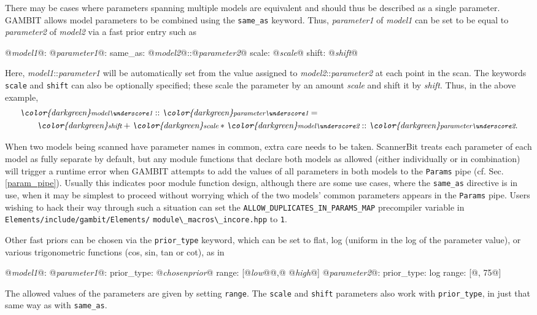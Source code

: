 \documentclass[pdftex,twocolumn,epjc3_preprint,runningheads]{svjour3}
\renewcommand{\_}{\discretionary{\underscore}{}{\underscore}}
\newcommand\cpp[1]{{\lstinline!#1!}}  %
\newcommand\yaml[1]{{\lstset{style=yaml}\lstinline!#1!\lstset{style=cpp}}}
\newcommand\yamlvalue[1]{{\YAMLvaluestyle\ttfamily#1}}
\newcommand\term[1]{{\lstset{style=terminal}\lstinline!#1!\lstset{style=cpp}}}
\newcommand\YAMLvaluestyle{\footnotesize\color{blue}\mdseries}
\newcommand{\metavarf}[1]{\textit{\color{darkgreen}\footnotesize\textrm{#1}}}
\newcommand{\metavar}{\metavarf}
\newcommand{\gambit}{\textsf{GAMBIT}\xspace}
\newcommand{\scannerbit}{\textsf{ScannerBit}\xspace}
\newcommand{\GB}{\gambit}
\begin{document}
There may be cases where parameters spanning multiple models are equivalent and should thus be described as a single parameter.  \GB allows model parameters to be combined using the \yaml{same_as} keyword.  Thus, \metavar{parameter\_1} of \metavar{model\_1} can be set to be equal to \metavar{parameter\_2} of \metavar{model\_2} via a fast prior entry such as
\begin{lstyaml}
  @\metavar{model\_1}@:
     @\metavar{parameter\_1}@:
        same_as: @\metavar{model\_2}@::@\metavar{parameter\_2}@
        scale: @\metavar{scale}@
        shift: @\metavar{shift}@
\end{lstyaml}
Here, \metavar{model\_1}::\metavar{parameter\_1} will be automatically set from the value assigned to \metavar{model\_2}::\metavar{parameter\_2} at each point in the scan.  The keywords \yaml{scale} and \yaml{shift} can also be optionally specified; these scale the parameter by an amount \metavar{scale} and shift it by \metavar{shift}.  Thus, in the above example,
\begin{eqnarray}
 \lefteqn{\metavar{model\_1}::\metavar{parameter\_1} =} \nonumber\\
 & & \quad \metavar{shift} + \metavar{scale} * \metavar{model\_2}::\metavar{parameter\_2}.
\end{eqnarray}

When two models being scanned have parameter names in common, extra care needs to be taken.  \scannerbit treats each parameter of each model as fully separate by default, but any module functions that declare both models as allowed (either individually or in combination) will trigger a runtime error when \GB attempts to add the values of all parameters in both models to the \cpp{Params} pipe (cf. Sec. \ref{param_pipe}).  Usually this indicates poor module function design, although there are some use cases, where the \yaml{same_as} directive is in use, when it may be simplest to proceed without worrying which of the two models' common parameters appears in the \cpp{Params} pipe.  Users wishing to hack their way through such a situation can set the \cpp{ALLOW_DUPLICATES_IN_PARAMS_MAP} precompiler variable in \term{Elements/include/gambit/}\term{Elements/} \term{module\_}\term{macros\_}\term{incore.hpp} to \cpp{1}.

Other fast priors can be chosen via the \yaml{prior_type} keyword, which can be set to \yamlvalue{flat}, \yamlvalue{log} (uniform in the log of the parameter value), or various trigonometric functions (\yamlvalue{cos}, \yamlvalue{sin}, \yamlvalue{tan} or \yamlvalue{cot}), as in
\begin{lstyaml}
  @\metavar{model\_1}@:
     @\metavar{parameter\_1}@:
        prior_type: @\metavar{chosen\_prior}@
        range: [@\metavar{low}@@\yamlvalue{,}@ @\metavar{high}@]
     @\metavar{parameter\_2}@:
        prior_type: log
        range: [@\yamlvalue{5, 75}@]
\end{lstyaml}
The allowed values of the parameters are given by setting \yaml{range}.  The \yaml{scale} and \yaml{shift} parameters also work with \yaml{prior_type}, in just that same way as with \yaml{same_as}.
\end{document}

